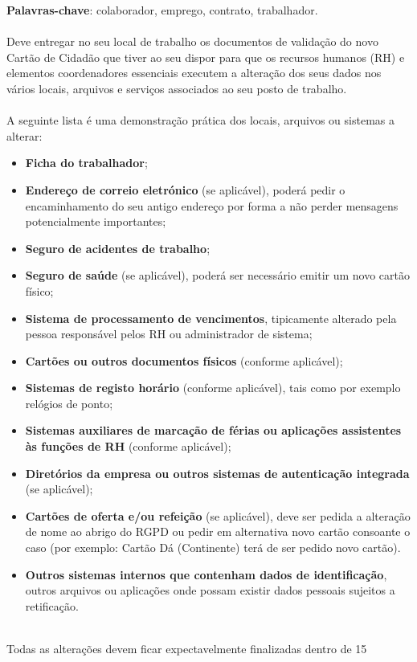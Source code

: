\textbf{Palavras-chave}: colaborador, emprego, contrato, trabalhador. \\
\\
Deve entregar no seu local de trabalho os documentos de validação do
novo Cartão de Cidadão que tiver ao seu dispor para que os recursos
humanos (RH) e elementos coordenadores essenciais executem a alteração
dos seus dados nos vários locais, arquivos e serviços associados ao seu
posto de trabalho. \\
\\
A seguinte lista é uma demonstração prática dos locais, arquivos ou
sistemas a alterar:
\begin{itemize}
	\item \textbf{Ficha do trabalhador};
	\item \textbf{Endereço de correio eletrónico} (se aplicável), poderá pedir o encaminhamento do seu antigo endereço por forma a não perder mensagens potencialmente importantes;
	\item \textbf{Seguro de acidentes de trabalho};
	\item \textbf{Seguro de saúde} (se aplicável), poderá ser necessário emitir um novo cartão físico;
	\item \textbf{Sistema de processamento de vencimentos}, tipicamente alterado pela pessoa responsável pelos RH ou administrador de sistema;
	\item \textbf{Cartões ou outros documentos físicos} (conforme aplicável);
	\item \textbf{Sistemas de registo horário} (conforme aplicável), tais como por exemplo relógios de ponto;
	\item \textbf{Sistemas auxiliares de marcação de férias ou aplicações assistentes às funções de RH} (conforme aplicável);
	\item \textbf{Diretórios da empresa ou outros sistemas de autenticação integrada} (se aplicável);
	\item \textbf{Cartões de oferta e/ou refeição} (se aplicável), deve ser pedida a alteração de nome ao abrigo do RGPD ou pedir em alternativa novo cartão consoante o caso (por exemplo: Cartão Dá (Continente) terá de ser pedido novo cartão).
	\item \textbf{Outros sistemas internos que contenham dados de identificação}, outros arquivos ou aplicações onde possam existir dados pessoais sujeitos a retificação.
\end{itemize}
\leavevmode\\
Todas as alterações devem ficar expectavelmente finalizadas dentro de 15
